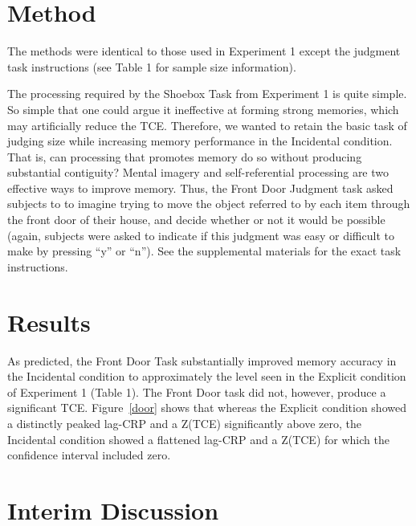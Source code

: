 \documentclass[jou,natbib]{apa6} %
\begin{document}
\section{Method}

The methods were identical to those used in Experiment 1 except the judgment task instructions (see Table 1 for sample size information).

The processing required by the Shoebox Task from Experiment 1 is quite simple. So simple that one could argue it ineffective at forming strong memories, which may artificially reduce the TCE. Therefore, we wanted to retain the basic task of judging size while increasing memory performance in the Incidental condition. That is, can processing that promotes memory do so without producing substantial contiguity? Mental imagery and self-referential processing are two effective ways to improve memory. Thus, the Front Door Judgment task asked subjects to to imagine trying to move the object referred to by each item through the front door of their house, and decide whether or not it would be possible (again, subjects were asked to indicate if this judgment was easy or difficult to make by pressing ``y'' or ``n'').
See the supplemental materials for the exact task instructions.

\section{Results}
As predicted, the Front Door Task substantially improved memory accuracy in the Incidental condition to approximately the level seen in the Explicit condition of Experiment 1 (Table 1). The Front Door task did not, however, produce a significant TCE. Figure~\ref{door} shows that whereas the Explicit condition showed a distinctly peaked lag-CRP and a Z(TCE) significantly above zero, the Incidental condition showed a flattened lag-CRP and a Z(TCE) for which the confidence interval included zero.

\begin{figure*}%
\caption{The temporal contiguity effect (TCE) with the Front Door size judgment task under explicit versus incidental encoding. \paneltext}
\label{door}
\end{figure*}

\section{Interim Discussion}
\end{document}
